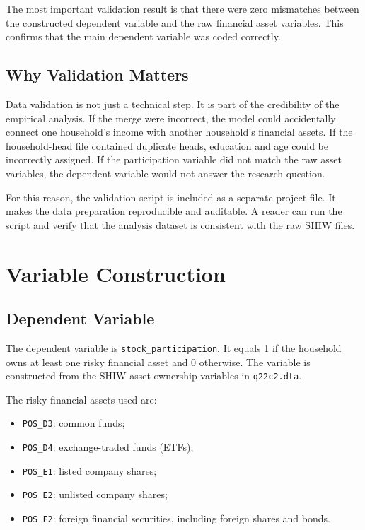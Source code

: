 \documentclass[12pt]{article}
\begin{document}
The most important validation result is that there were zero mismatches between the constructed dependent variable and the raw financial asset variables. This confirms that the main dependent variable was coded correctly.

\subsection{Why Validation Matters}

Data validation is not just a technical step. It is part of the credibility of the empirical analysis. If the merge were incorrect, the model could accidentally connect one household's income with another household's financial assets. If the household-head file contained duplicate heads, education and age could be incorrectly assigned. If the participation variable did not match the raw asset variables, the dependent variable would not answer the research question.

For this reason, the validation script is included as a separate project file. It makes the data preparation reproducible and auditable. A reader can run the script and verify that the analysis dataset is consistent with the raw SHIW files.

\section{Variable Construction}

\subsection{Dependent Variable}

The dependent variable is \texttt{stock\_participation}. It equals 1 if the household owns at least one risky financial asset and 0 otherwise. The variable is constructed from the SHIW asset ownership variables in \texttt{q22c2.dta}.

The risky financial assets used are:

\begin{itemize}[leftmargin=*]
    \item \texttt{POS\_D3}: common funds;
    \item \texttt{POS\_D4}: exchange-traded funds (ETFs);
    \item \texttt{POS\_E1}: listed company shares;
    \item \texttt{POS\_E2}: unlisted company shares;
    \item \texttt{POS\_F2}: foreign financial securities, including foreign shares and bonds.
\end{itemize}
\end{document}
